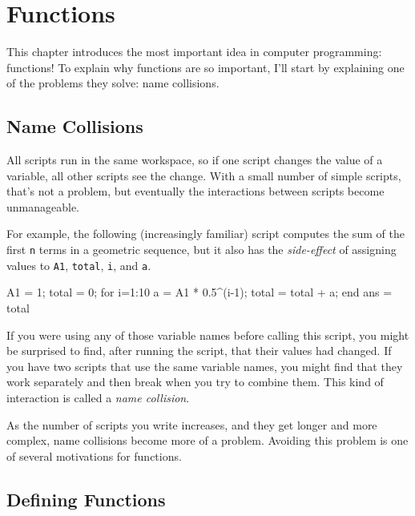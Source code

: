 \chapter{Functions}
\label{functions}
\minitoc{}

This chapter introduces the most important idea in computer programming: functions! 
To explain why functions are so important, I'll start by explaining one of the problems they solve: name collisions.


\section{Name Collisions}
\label{collision}


All scripts run in the same workspace, so if one script changes the value of a variable, all other scripts see the change.  With a small number of simple scripts, that's not a problem, but eventually the interactions between scripts become unmanageable.

For example, the following (increasingly familiar) script computes the
sum of the first {\tt n} terms in a geometric sequence, but it also
has the {\em side-effect} of assigning values to {\tt A1}, {\tt total},
{\tt i}, and {\tt a}.

\begin{code}
A1 = 1;
total = 0;
for i=1:10
    a = A1 * 0.5^(i-1);
    total = total + a;
end
ans = total
\end{code}

If you were using any of those variable names before calling this
script, you might be surprised to find, after running the script,
that their values had changed.  If you have two scripts that use
the same variable names, you might find that they work separately
and then break when you try to combine them.  This kind of
interaction is called a \emph{name collision}.


As the number of scripts you write increases, and they get longer
and more complex, name collisions become more of a problem.  Avoiding
this problem is one of several motivations for functions.

\section{Defining Functions}

